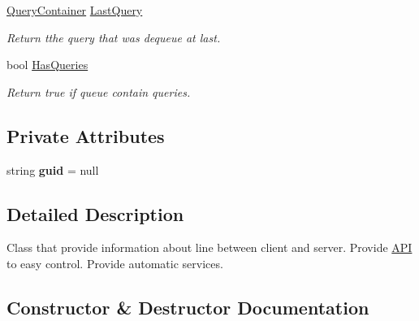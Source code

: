 \begin{DoxyCompactItemize}
\mbox{\hyperlink{struct_pipes_provider_1_1_query_container}{Query\+Container}} \mbox{\hyperlink{class_pipes_provider_1_1_transmission_line_a3cc3f03332be99b5f380772587ca2883}{Last\+Query}}
\begin{DoxyCompactList}\small\item\em Return tthe query that was dequeue at last. \end{DoxyCompactList}\item 
bool \mbox{\hyperlink{class_pipes_provider_1_1_transmission_line_a39f81c072ca65efd260d02fc7d5c5458}{Has\+Queries}}
\begin{DoxyCompactList}\small\item\em Return true if queue contain queries. \end{DoxyCompactList}\end{DoxyCompactItemize}
\subsection*{Private Attributes}
\begin{DoxyCompactItemize}
\item 
\mbox{\label{class_pipes_provider_1_1_transmission_line_acb5a54fae46da3287a364144e495a29d}} 
string {\bfseries guid} = null
\end{DoxyCompactItemize}


\subsection{Detailed Description}
Class that provide information about line between client and server. Provide \mbox{\hyperlink{class_pipes_provider_1_1_a_p_i}{A\+PI}} to easy control. Provide automatic services. 



\subsection{Constructor \& Destructor Documentation}
\mbox{\label{class_pipes_provider_1_1_transmission_line_a9002723c5fa3ec06f81470390b7ef685}} 
